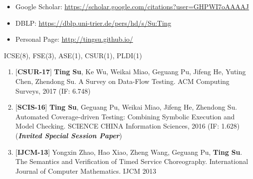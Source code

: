 \documentclass[margin]{res}
\begin{document}
\begin{resume}
\begin{itemize}[leftmargin=*]
    \item Google Scholar: \url{https://scholar.google.com/citations?user=GHPWI7oAAAAJ}
    \item DBLP: \url{https://dblp.uni-trier.de/pers/hd/s/Su:Ting}
    \item Personal Page: \url{http://tingsu.github.io/}
\end{itemize}

 ICSE(8), FSE(3), ASE(1), CSUR(1), PLDI(1)

\begin{enumerate}[leftmargin=*]
    \item $[$\textbf{CSUR-17}$]$ \textbf{Ting Su}, Ke Wu, Weikai Miao, Geguang Pu, Jifeng He, Yuting Chen, Zhendong Su. A Survey on Data-Flow Testing. ACM Computing Surveys, 2017 (IF: 6.748)
    \item $[$\textbf{SCIS-16}$]$ \textbf{Ting Su}, Geguang Pu, Weikai Miao, Jifeng He, Zhendong Su. Automated Coverage-driven Testing: Combining Symbolic Execution and Model Checking. SCIENCE CHINA Information Sciences, 2016 (IF: 1.628) (\textbf{\emph{Invited Special Session Paper}})
    \item $[$\textbf{IJCM-13}$]$ Yongxin Zhao, Hao Xiao, Zheng Wang, Geguang Pu, \textbf{Ting Su}. The Semantics and Verification of Timed Service Choreography. International Journal of Computer Mathematics. IJCM 2013
\end{enumerate}


\end{resume}
\end{document}
